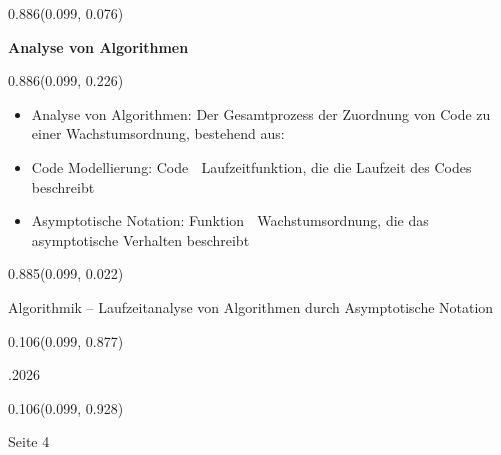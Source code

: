 \documentclass[aspectratio=169]{beamer}
\begin{document}
\begin{frame}[fragile]
  \begin{textblock}{0.886}(0.099, 0.076)
    \begin{minipage}[t][0.131\paperheight]{\linewidth}
      \textbf{Analyse von Algorithmen}
    \end{minipage}
  \end{textblock}

  \begin{textblock}{0.886}(0.099, 0.226)
    \begin{minipage}[b][0.63\paperheight]{\linewidth}
      \scriptsize
      \begin{itemize}
        \item Analyse von Algorithmen: Der Gesamtprozess der Zuordnung von Code zu einer Wachstumsordnung, bestehend aus:
        \item Code Modellierung: Code  Laufzeitfunktion, die die Laufzeit des Codes beschreibt
        \item Asymptotische Notation: Funktion  Wachstumsordnung, die das asymptotische Verhalten beschreibt
      \end{itemize}
    \end{minipage}
  \end{textblock}

  \begin{textblock}{0.885}(0.099, 0.022)
    \begin{minipage}[b][0.031\paperheight]{\linewidth}
      \raggedright
      \fontsize{3}{3.3}\selectfont Algorithmik – Laufzeitanalyse von Algorithmen durch Asymptotische Notation
    \end{minipage}
  \end{textblock}

  \begin{textblock}{0.106}(0.099, 0.877)
    \begin{minipage}[b][0.026\paperheight]{\linewidth}
      \raggedright
      \fontsize{3}{3.3}.2026
    \end{minipage}
  \end{textblock}

  \begin{textblock}{0.106}(0.099, 0.928)
    \begin{minipage}[b][0.031\paperheight]{\linewidth}
      \raggedright
      \fontsize{3}{3.3}\selectfont Seite 4
    \end{minipage}
  \end{textblock}


\end{frame}
\end{document}
